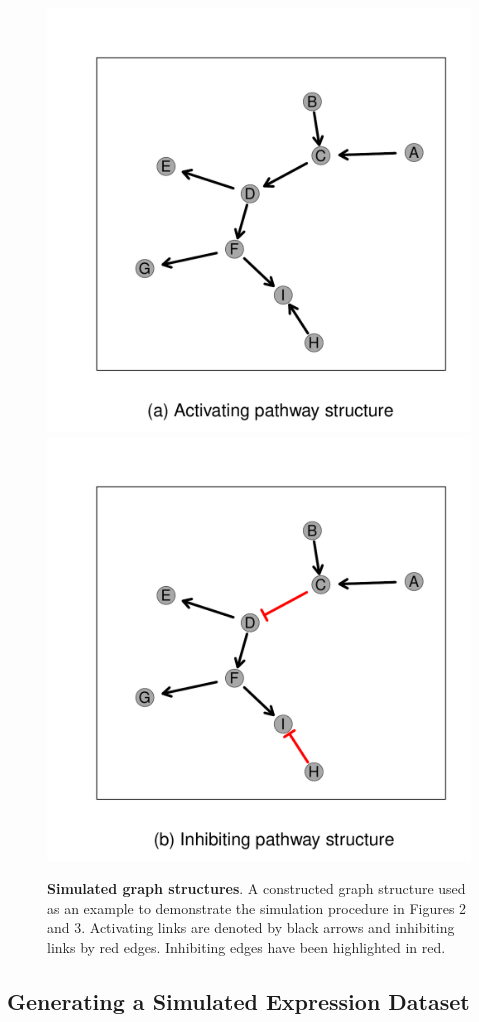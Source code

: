 \documentclass[]{article}
\begin{document}
\begin{figure}

{\centering \includegraphics[width=.415\linewidth,height=.415\linewidth]{Plotsimple_graph-1} \includegraphics[width=.415\linewidth,height=.415\linewidth]{Plotsimple_graph-2} 

}

\caption{\textbf{Simulated graph structures}. A constructed graph structure used as an example to demonstrate the simulation procedure in Figures 2 and 3. Activating links are denoted by black arrows and inhibiting links by red edges. Inhibiting edges have been highlighted in red.}\label{fig:simple_graph}
\end{figure}

\hypertarget{sec:graphsim_demo}{%
\subsection{Generating a Simulated Expression
Dataset}\label{sec:graphsim_demo}}
\end{document}
